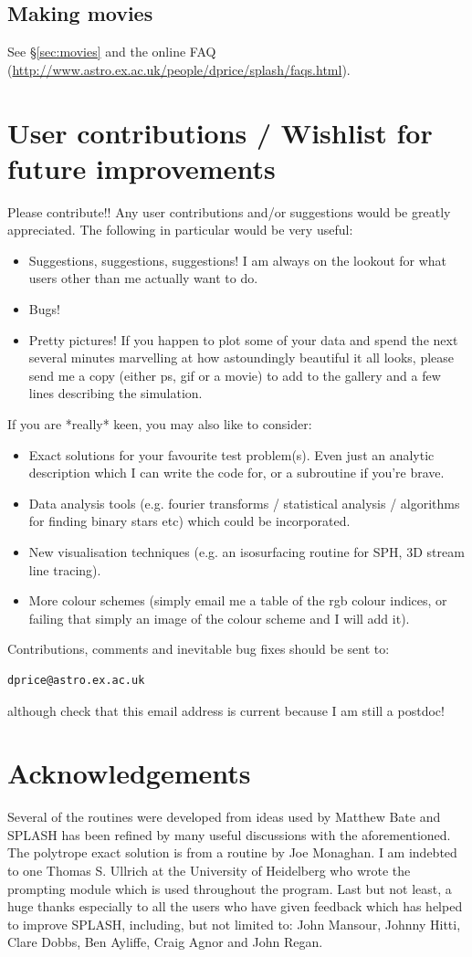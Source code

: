 \documentclass[a4paper,11pt]{article}
\begin{document}
\subsection{Making movies}
See \S\ref{sec:movies} and the online FAQ (\url{http://www.astro.ex.ac.uk/people/dprice/splash/faqs.html}).

\section{User contributions / Wishlist for future improvements}
 Please contribute!! Any user contributions and/or suggestions would be greatly
appreciated. The following in particular would be very useful:
\begin{itemize}
\item Suggestions, suggestions, suggestions! I am always on the lookout for what users other than me actually want to do.
\item Bugs!
\item Pretty pictures! If you happen to plot some of your data and spend the
next several minutes marvelling at how astoundingly beautiful it all looks, please send
me a copy (either ps, gif or a movie) to add to the gallery and a few lines
describing the simulation.
\end{itemize}
If you are *really* keen, you may also like to consider:
\begin{itemize}
\item Exact solutions for your favourite test problem(s). Even just an analytic description which I can write the code for, or a subroutine if you're brave.
\item Data analysis tools (e.g. fourier transforms / statistical analysis /
algorithms for finding binary stars etc) which could be incorporated.
\item New visualisation techniques (e.g. an isosurfacing routine for SPH, 3D stream line tracing).
\item More colour schemes (simply email me a table of the rgb colour indices, or failing that simply an image of the colour scheme and I will add it).
\end{itemize}
Contributions, comments and inevitable bug fixes
should be sent to:
\begin{verbatim}
dprice@astro.ex.ac.uk
\end{verbatim}
although check that this email address is current because I am still a postdoc!

\section*{Acknowledgements}
 Several of the routines were developed from ideas used by Matthew Bate and SPLASH has been refined by many useful discussions with the aforementioned. The
polytrope exact solution is from a routine by Joe Monaghan. I am indebted to one
Thomas S. Ullrich at the University of Heidelberg who wrote the prompting module
which is used throughout the program. Last but not least, a huge thanks especially to all the users who have given feedback which has helped to improve SPLASH, including, but not limited to: John Mansour, Johnny Hitti, Clare Dobbs, Ben Ayliffe, Craig Agnor and John Regan.
\end{document}
